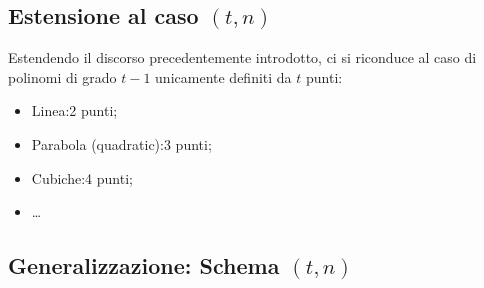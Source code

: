\documentclass{book}
\begin{document}
\subsection{Estensione al caso \((t,n)\)}
Estendendo il discorso precedentemente introdotto, ci si riconduce al caso di polinomi di grado \(t-1\) unicamente definiti da \(t\) punti:
\begin{itemize}
    \item Linea:\@2 punti;
    \item Parabola (quadratic):\@3 punti;
    \item Cubiche:\@4 punti;
    \item \dots
\end{itemize}
\subsection{Generalizzazione: Schema \((t,n)\)}
\end{document}
